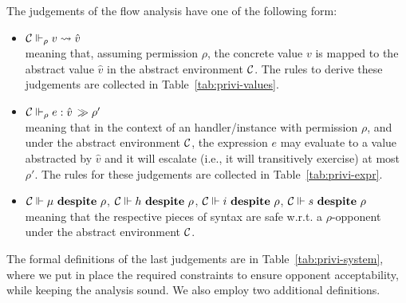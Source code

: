 The judgements of the flow analysis have one of the following form:
\begin{itemize}
\item ${\cal C} \Vdash_\rho v \rightsquigarrow \hat{v}$\\
meaning that, assuming permission $\rho$, the concrete value $v$ is
mapped to the abstract value $\hat{v}$ in the abstract environment ${\cal C}$. 
The rules to derive these judgements are collected in
Table~\ref{tab:privi-values}.
\item 
 ${\cal C}  \Vdash_\rho e: \hat{v} \,\gg \rho'$\\
meaning that in the context of an handler/instance with permission
$\rho$, and under the abstract environment ${\cal C}$, 
the expression $e$ may evaluate to a value abstracted by $\hat{v}$ 
and it will escalate (i.e., it will transitively exercise) at most
$\rho'$. The rules for these judgements 
are collected in Table~\ref{tab:privi-expr}. 
\item ${\cal C} \Vdash \mu \ \mathbf{despite}\ \rho$, ${\cal C} \Vdash h \ \mathbf{despite}\ \rho$, 
${\cal C} \Vdash i \ \mathbf{despite}\ \rho$, ${\cal C} \Vdash s \ \mathbf{despite}\ \rho$\\
meaning that the respective pieces of syntax are safe w.r.t. a $\rho$-opponent
under the abstract environment ${\cal C}$.
\end{itemize}
The formal definitions of the last judgements are in Table~\ref{tab:privi-system},
where we put in place the required constraints to ensure opponent acceptability,
while keeping the analysis sound. We also employ two additional definitions. 


